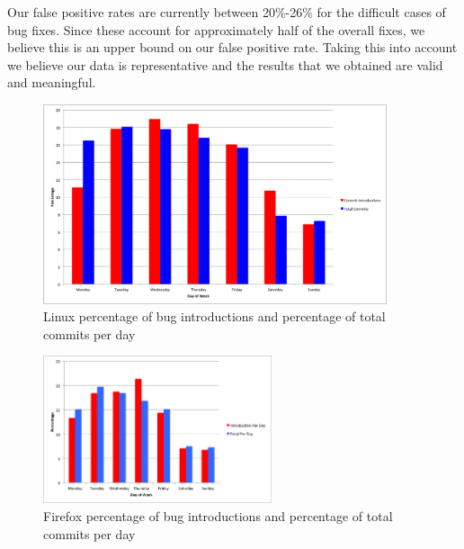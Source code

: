 \documentclass[preprint, 11pt]{sigplanconf}
\begin{document}
Our false positive rates are currently between 20\%-26\% for the
difficult cases of bug fixes. Since these account for approximately
half of the overall fixes, we believe this is an upper bound on our
false positive rate. Taking this into account we believe our data is
representative and the results that we obtained are valid and meaningful.

\begin{figure}
\begin{center}
\includegraphics[width=0.9\textwidth]{linux_bug_introduction_day_of_week.png}
\end{center}
\caption{Linux percentage of bug introductions and percentage of total commits per day}
\label{fig-linux-weekday}
\end{figure}

\begin{figure}
\begin{center}
\includegraphics[width=0.6\textwidth]{firefox_bug_introduction_day_of_week.png}
\end{center}
\caption{Firefox percentage of bug introductions and percentage of total commits per day}
\label{fig-firefox-weekday}
\end{figure}
\end{document}
